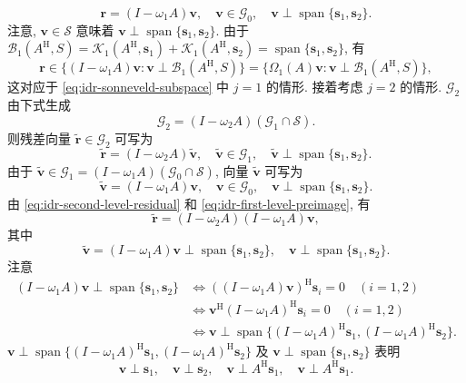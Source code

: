 \[\bm r=(I-\omega_1A)\bm v,\quad\bm v\in\mathcal G_0,\quad\bm v\perp\operatorname{span}\{\bm s_1,\bm s_2\}.\]
{注意, $\bm v\in\mathcal S$ 意味着 $\bm v\perp\operatorname{span}\{\bm s_1,\bm s_2\}$. 由于 $\mathcal B_1(A^{\mathrm H},S)=\mathcal K_1(A^{\mathrm H},\bm s_1)+\mathcal K_1(A^{\mathrm H},\bm s_2)=\operatorname{span}\{\bm s_1,\bm s_2\}$, 有}
\[\bm r\in\{(I-\omega_1A)\bm v:\bm v\perp\mathcal B_1(A^{\mathrm H},S)\}=\{\Omega_1(A)\bm v:\bm v\perp\mathcal B_1(A^{\mathrm H},S)\},\]
{这对应于 \eqref{eq:idr-sonneveld-subspace} 中 $j=1$ 的情形.}
{接着考虑 $j=2$ 的情形. $\mathcal G_2$ 由下式生成}
\[\mathcal G_2=(I-\omega_2A)(\mathcal G_1\cap\mathcal S).\]
{则残差向量 $\widetilde{\bm r}\in\mathcal G_2$ 可写为}
\begin{equation}\label{eq:idr-second-level-residual}\widetilde{\bm r}=(I-\omega_2A)\widetilde{\bm v},\quad\widetilde{\bm v}\in\mathcal G_1,\quad\widetilde{\bm v}\perp\operatorname{span}\{\bm s_1,\bm s_2\}.\end{equation}
{由于 $\widetilde{\bm v}\in\mathcal G_1=(I-\omega_1A)(\mathcal G_0\cap\mathcal S)$, 向量 $\widetilde{\bm v}$ 可写为}
\begin{equation}\label{eq:idr-first-level-preimage}\widetilde{\bm v}=(I-\omega_1A)\bm v,\quad\bm v\in\mathcal G_0,\quad\bm v\perp\operatorname{span}\{\bm s_1,\bm s_2\}.\end{equation}
{由 \eqref{eq:idr-second-level-residual} 和 \eqref{eq:idr-first-level-preimage}, 有}
\begin{equation}\label{eq:idr-two-factor-residual}\widetilde{\bm r}=(I-\omega_2A)(I-\omega_1A)\bm v,\end{equation}
{其中}
\[\widetilde{\bm v}=(I-\omega_1A)\bm v\perp\operatorname{span}\{\bm s_1,\bm s_2\},\quad\bm v\perp\operatorname{span}\{\bm s_1,\bm s_2\}.\]
{注意}
\[\begin{aligned}(I-\omega_1A)\bm v\perp\operatorname{span}\{\bm s_1,\bm s_2\}&\Leftrightarrow((I-\omega_1A)\bm v)^{\mathrm H}\bm s_i=0\quad(i=1,2)\\&\Leftrightarrow\bm v^{\mathrm H}(I-\omega_1A)^{\mathrm H}\bm s_i=0\quad(i=1,2)\\&\Leftrightarrow\bm v\perp\operatorname{span}\{(I-\omega_1A)^{\mathrm H}\bm s_1,(I-\omega_1A)^{\mathrm H}\bm s_2\}.\end{aligned}\]
{$\bm v\perp\operatorname{span}\{(I-\omega_1A)^{\mathrm H}\bm s_1,(I-\omega_1A)^{\mathrm H}\bm s_2\}$ 及 $\bm v\perp\operatorname{span}\{\bm s_1,\bm s_2\}$ 表明}
\[\bm v\perp\bm s_1,\quad\bm v\perp\bm s_2,\quad\bm v\perp A^{\mathrm H}\bm s_1,\quad\bm v\perp A^{\mathrm H}\bm s_1.\]
